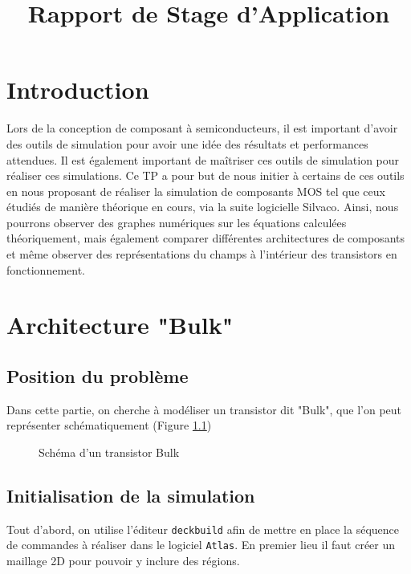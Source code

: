 \documentclass[a4paper,11pt]{report}
\title{Rapport de Stage d'Application}
\begin{document}


\chapter*{Introduction}
Lors de la conception de composant à semiconducteurs, il est important d'avoir des outils de simulation pour avoir une idée des résultats et performances attendues. Il est également important de maîtriser ces outils de simulation pour réaliser ces simulations. Ce TP a pour but de nous initier à certains de ces outils en nous proposant de réaliser la simulation de composants MOS tel que ceux étudiés de manière théorique en cours, via la suite logicielle Silvaco. Ainsi, nous pourrons observer des graphes numériques sur les équations calculées théoriquement, mais également comparer différentes architectures de composants et même observer des représentations du champs à l'intérieur des transistors en fonctionnement.

\chapter{Architecture "Bulk"}

\section{Position du problème}
Dans cette partie, on cherche à modéliser un transistor dit "Bulk", que l'on peut représenter schématiquement (Figure \ref{SchemaBulk})
\begin{figure}[H]
    \centering
    \caption{Schéma d'un transistor Bulk}
    \label{SchemaBulk}
\end{figure}
\section{Initialisation de la simulation}

Tout d'abord, on utilise l'éditeur \texttt{deckbuild} afin de mettre en place la séquence de commandes à réaliser dans le logiciel \texttt{Atlas}. En premier lieu il faut créer un maillage 2D pour pouvoir y inclure des régions.
\vspace{0.3cm}
\end{document}
